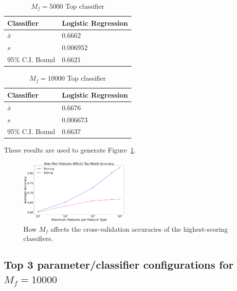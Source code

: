 \documentclass[11pt]{article}
\begin{document}
\begin{table}[H]
	\begin{center}
		\begin{tabular}{|l|l|}			
			\hline
			Classifier & Logistic Regression \\
			\hline\hline
			$\bar{x}$ &  0.6662\\
			$s$ & 0.006952 \\
			95\% C.I. Bound & 0.6621 \\
			\hline
		\end{tabular}
		\caption{$M_f = 5000$ Top classifier}
		\label{tbl:mf5000}
	\end{center}
\end{table}

\begin{table}[H]
	\begin{center}
		\begin{tabular}{|l|l|}			
			\hline
			Classifier & Logistic Regression \\
			\hline\hline
			$\bar{x}$ &  0.6676\\
			$s$ & 0.006673 \\
			95\% C.I. Bound & 0.6637 \\
			\hline
		\end{tabular}
		\caption{$M_f = 10000$ Top classifier}
		\label{tbl:mf10000}
	\end{center}
\end{table}

These results are used to generate Figure~\ref{fig:accvsmf}.

\begin{figure}[H]
	\centering
	\includegraphics[width = 0.49\textwidth]{how-mf-varies-accuracies.png}
	\caption{How $M_f$ affects the cross-validation accuracies of the highest-scoring classifiers.}
	\label{fig:accvsmf}
\end{figure} 

\subsection{Top 3 parameter/classifier configurations for $M_f = 10000$}\label{sec:top3}
\end{document}
